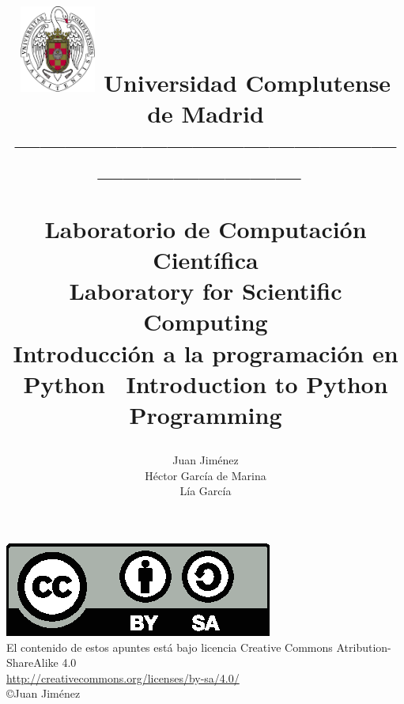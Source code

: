 \documentclass[a4paper,10pt]{book}
\begin{document}
\title{
\begin{flushleft}
\includegraphics[width=2.5cm]{ucm2.pdf}
Universidad Complutense de Madrid\\
---------------------------------------------------------------------\
\end{flushleft}
Laboratorio de Computaci\'on Cient\'ifica \\ Laboratory for Scientific Computing\\ Introducción a la programaci\'on en Python \textreferencemark \ Introduction to Python Programming}
\author{ Juan Jim\'enez\\ H\'ector Garc\'ia de Marina\\ L\'ia Garc\'ia }
\maketitle
\vspace*{\fill}

\includegraphics[scale=1]{by-sa.eps}\\
El contenido de estos apuntes est\'a bajo licencia Creative Commons Atribution-ShareAlike 4.0\\
\href{http://creativecommons.org/licenses/by-sa/4.0/}{http://creativecommons.org/licenses/by-sa/4.0/}\\
\copyright Juan Jim\'enez

\bigskip
\tableofcontents
\listoffigures
\listoftables

%
%

%
%
%
%
%
%
%
%
%
\printindex
\printindex[eng]
\end{document}
